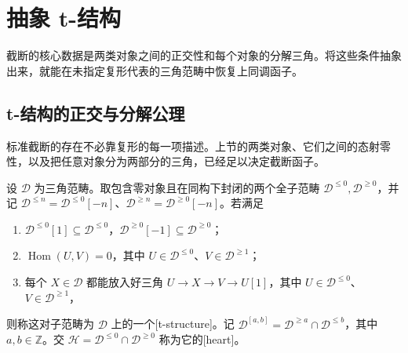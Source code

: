 
\section{抽象 t-结构}
\label{b4:sec:1902}

截断的核心数据是两类对象之间的正交性和每个对象的分解三角。将这些条件抽象出来，就能在未指定复形代表的三角范畴中恢复上同调函子。


%
%

\subsection{t-结构的正交与分解公理}
\label{b4:subsec:1902:01}

标准截断的存在不必靠复形的每一项描述。上节的两类对象、它们之间的态射零性，以及把任意对象分为两部分的三角，已经足以决定截断函子。

\begin{definition}\label{b4:def:t-structure}
	设 \(\mathcal D\) 为三角范畴。取包含零对象且在同构下封闭的两个全子范畴 \(\mathcal D^{\le0},\mathcal D^{\ge0}\)，并记 \(\mathcal D^{\le n}=\mathcal D^{\le0}[-n]\)、\(\mathcal D^{\ge n}=\mathcal D^{\ge0}[-n]\)。若满足
	\begin{enumerate}
		\item \(\mathcal D^{\le0}[1]\subseteq\mathcal D^{\le0}\)，\(\mathcal D^{\ge0}[-1]\subseteq\mathcal D^{\ge0}\)；
		\item \(\operatorname{Hom}(U,V)=0\)，其中 \(U\in\mathcal D^{\le0}\)、\(V\in\mathcal D^{\ge1}\)；
		\item 每个 \(X\in\mathcal D\) 都能放入好三角 \(U\to X\to V\to U[1]\)，其中 \(U\in\mathcal D^{\le0}\)、\(V\in\mathcal D^{\ge1}\)，
	\end{enumerate}
	则称这对子范畴为 \(\mathcal D\) 上的一个[t-structure]。记 \(\mathcal D^{[a,b]}=\mathcal D^{\ge a}\cap\mathcal D^{\le b}\)，其中 \(a,b\in\mathbb Z\)。交 \(\mathcal H=\mathcal D^{\le0}\cap\mathcal D^{\ge0}\) 称为它的[heart]。
\end{definition}

